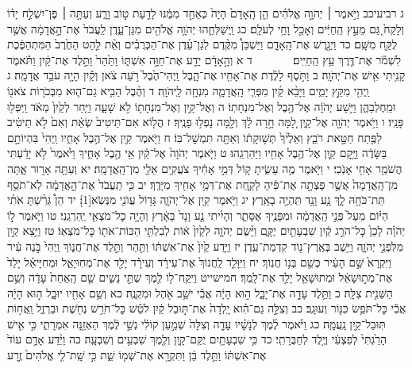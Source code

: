 \documentclass[twoside, openany, parskip=half, 11pt]{book}
\begin{document}
ג רביעיכב וַיֹּ֣אמֶר ׀ יְהֹוָ֣ה אֱלֹהִ֗ים הֵ֤ן הָֽאָדָם֙ הָיָה֙ כְּאַחַ֣ד מִמֶּ֔נּוּ לָדַ֖עַת ט֣וֹב וָרָ֑ע וְעַתָּ֣ה ׀ פֶּן־יִשְׁלַ֣ח יָד֗וֹ וְלָקַח֙ גַּ֚ם מֵעֵ֣ץ הַֽחַיִּ֔ים וְאָכַ֖ל וָחַ֥י לְעֹלָֽם׃ כג וַֽיְשַׁלְּחֵ֛הוּ יְהֹוָ֥ה אֱלֹהִ֖ים מִגַּן־עֵ֑דֶן לַֽעֲבֹד֙ אֶת־הָ֣אֲדָמָ֔ה אֲשֶׁ֥ר לֻקַּ֖ח מִשָּֽׁם׃ כד וַיְגָ֖רֶשׁ אֶת־הָֽאָדָ֑ם וַיַּשְׁכֵּן֩ מִקֶּ֨דֶם לְגַן־עֵ֜דֶן אֶת־הַכְּרֻבִ֗ים וְאֵ֨ת לַ֤הַט הַחֶ֙רֶב֙ הַמִּתְהַפֶּ֔כֶת לִשְׁמֹ֕ר אֶת־דֶּ֖רֶךְ עֵ֥ץ הַֽחַיִּֽים׃
　　　 ד א וְהָ֣אָדָ֔ם יָדַ֖ע אֶת־חַוָּ֣ה אִשְׁתּ֑וֹ וַתַּ֙הַר֙ וַתֵּ֣לֶד אֶת־קַ֔יִן וַתֹּ֕אמֶר קָנִ֥יתִי אִ֖ישׁ אֶת־יְהֹוָֽה׃ ב וַתֹּ֣סֶף לָלֶ֔דֶת אֶת־אָחִ֖יו אֶת־הָ֑בֶל וַֽיְהִי־הֶ֙בֶל֙ רֹ֣עֵה צֹ֔אן וְקַ֕יִן הָיָ֖ה עֹבֵ֥ד אֲדָמָֽה׃ ג וַֽיְהִ֖י מִקֵּ֣ץ יָמִ֑ים וַיָּבֵ֨א קַ֜יִן מִפְּרִ֧י הָֽאֲדָמָ֛ה מִנְחָ֖ה לַֽיהֹוָֽה׃ ד וְהֶ֨בֶל הֵבִ֥יא גַם־ה֛וּא מִבְּכֹר֥וֹת צֹאנ֖וֹ וּמֵֽחֶלְבֵהֶ֑ן וַיִּ֣שַׁע יְהֹוָ֔ה אֶל־הֶ֖בֶל וְאֶל־מִנְחָתֽוֹ׃ ה וְאֶל־קַ֥יִן וְאֶל־מִנְחָת֖וֹ לֹ֣א שָׁעָ֑ה וַיִּ֤חַר לְקַ֙יִן֙ מְאֹ֔ד וַֽיִּפְּל֖וּ פָּנָֽיו׃ ו וַיֹּ֥אמֶר יְהֹוָ֖ה אֶל־קָ֑יִן לָ֚מָּה חָ֣רָה לָ֔ךְ וְלָ֖מָּה נָפְל֥וּ פָנֶֽיךָ׃ ז הֲל֤וֹא אִם־תֵּיטִיב֙ שְׂאֵ֔ת וְאִם֙ לֹ֣א תֵיטִ֔יב לַפֶּ֖תַח חַטָּ֣את רֹבֵ֑ץ וְאֵלֶ֙יךָ֙ תְּשׁ֣וּקָת֔וֹ וְאַתָּ֖ה תִּמְשׇׁל־בּֽוֹ׃ ח וַיֹּ֥אמֶר קַ֖יִן אֶל־הֶ֣בֶל אָחִ֑יו וַֽיְהִי֙ בִּהְיוֹתָ֣ם בַּשָּׂדֶ֔ה וַיָּ֥קׇם קַ֛יִן אֶל־הֶ֥בֶל אָחִ֖יו וַיַּהַרְגֵֽהוּ׃ ט וַיֹּ֤אמֶר יְהֹוָה֙ אֶל־קַ֔יִן אֵ֖י הֶ֣בֶל אָחִ֑יךָ וַיֹּ֙אמֶר֙ לֹ֣א יָדַ֔עְתִּי הֲשֹׁמֵ֥ר אָחִ֖י אָנֹֽכִי׃ י וַיֹּ֖אמֶר מֶ֣ה עָשִׂ֑יתָ ק֚וֹל דְּמֵ֣י אָחִ֔יךָ צֹעֲקִ֥ים אֵלַ֖י מִן־הָֽאֲדָמָֽה׃ יא וְעַתָּ֖ה אָר֣וּר אָ֑תָּה מִן־הָֽאֲדָמָה֙ אֲשֶׁ֣ר פָּצְתָ֣ה אֶת־פִּ֔יהָ לָקַ֛חַת אֶת־דְּמֵ֥י אָחִ֖יךָ מִיָּדֶֽךָ׃ יב כִּ֤י תַֽעֲבֹד֙ אֶת־הָ֣אֲדָמָ֔ה לֹֽא־תֹסֵ֥ף תֵּת־כֹּחָ֖הּ לָ֑ךְ נָ֥ע וָנָ֖ד תִּֽהְיֶ֥ה בָאָֽרֶץ׃ יג וַיֹּ֥אמֶר קַ֖יִן אֶל־יְהֹוָ֑ה גָּד֥וֹל עֲוֺנִ֖י מִנְּשֹֽׂא‏[1]׃ יד הֵן֩ גֵּרַ֨שְׁתָּ אֹתִ֜י הַיּ֗וֹם מֵעַל֙ פְּנֵ֣י הָֽאֲדָמָ֔ה וּמִפָּנֶ֖יךָ אֶסָּתֵ֑ר וְהָיִ֜יתִי נָ֤ע וָנָד֙ בָּאָ֔רֶץ וְהָיָ֥ה כׇל־מֹצְאִ֖י יַֽהַרְגֵֽנִי׃ טו וַיֹּ֧אמֶר ל֣וֹ יְהֹוָ֗ה לָכֵן֙ כׇּל־הֹרֵ֣ג קַ֔יִן שִׁבְעָתַ֖יִם יֻקָּ֑ם וַיָּ֨שֶׂם יְהֹוָ֤ה לְקַ֙יִן֙ א֔וֹת לְבִלְתִּ֥י הַכּוֹת־אֹת֖וֹ כׇּל־מֹצְאֽוֹ׃ טז וַיֵּ֥צֵא קַ֖יִן מִלִּפְנֵ֣י יְהֹוָ֑ה וַיֵּ֥שֶׁב בְּאֶֽרֶץ־נ֖וֹד קִדְמַת־עֵֽדֶן׃ יז וַיֵּ֤דַע קַ֙יִן֙ אֶת־אִשְׁתּ֔וֹ וַתַּ֖הַר וַתֵּ֣לֶד אֶת־חֲנ֑וֹךְ וַֽיְהִי֙ בֹּ֣נֶה עִ֔יר וַיִּקְרָא֙ שֵׁ֣ם הָעִ֔יר כְּשֵׁ֖ם בְּנ֥וֹ חֲנֽוֹךְ׃ יח וַיִּוָּלֵ֤ד לַֽחֲנוֹךְ֙ אֶת־עִירָ֔ד וְעִירָ֕ד יָלַ֖ד אֶת־מְחֽוּיָאֵ֑ל וּמְחִיָּיאֵ֗ל יָלַד֙ אֶת־מְת֣וּשָׁאֵ֔ל וּמְתוּשָׁאֵ֖ל יָלַ֥ד אֶת־לָֽמֶךְ׃ חמישייט וַיִּֽקַּֽח־ל֥וֹ לֶ֖מֶךְ שְׁתֵּ֣י נָשִׁ֑ים שֵׁ֤ם הָֽאַחַת֙ עָדָ֔ה וְשֵׁ֥ם הַשֵּׁנִ֖ית צִלָּֽה׃ כ וַתֵּ֥לֶד עָדָ֖ה אֶת־יָבָ֑ל ה֣וּא הָיָ֔ה אֲבִ֕י יֹשֵׁ֥ב אֹ֖הֶל וּמִקְנֶֽה׃ כא וְשֵׁ֥ם אָחִ֖יו יוּבָ֑ל ה֣וּא הָיָ֔ה אֲבִ֕י כׇּל־תֹּפֵ֥שׂ כִּנּ֖וֹר וְעוּגָֽב׃ כב וְצִלָּ֣ה גַם־הִ֗וא יָֽלְדָה֙ אֶת־תּ֣וּבַל קַ֔יִן לֹטֵ֕שׁ כׇּל־חֹרֵ֥שׁ נְחֹ֖שֶׁת וּבַרְזֶ֑ל וַֽאֲח֥וֹת תּֽוּבַל־קַ֖יִן נַֽעֲמָֽה׃ כג וַיֹּ֨אמֶר לֶ֜מֶךְ לְנָשָׁ֗יו עָדָ֤ה וְצִלָּה֙ שְׁמַ֣עַן קוֹלִ֔י נְשֵׁ֣י לֶ֔מֶךְ הַאְזֵ֖נָּה אִמְרָתִ֑י כִּ֣י אִ֤ישׁ הָרַ֙גְתִּי֙ לְפִצְעִ֔י וְיֶ֖לֶד לְחַבֻּרָתִֽי׃ כד כִּ֥י שִׁבְעָתַ֖יִם יֻקַּם־קָ֑יִן וְלֶ֖מֶךְ שִׁבְעִ֥ים וְשִׁבְעָֽה׃ כה וַיֵּ֨דַע אָדָ֥ם עוֹד֙ אֶת־אִשְׁתּ֔וֹ וַתֵּ֣לֶד בֵּ֔ן וַתִּקְרָ֥א אֶת־שְׁמ֖וֹ שֵׁ֑ת כִּ֣י שָֽׁת־לִ֤י אֱלֹהִים֙ זֶ֣רַע 
\end{document}
